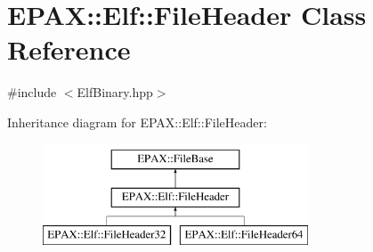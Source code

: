 \hypertarget{class_e_p_a_x_1_1_elf_1_1_file_header}{\section{\-E\-P\-A\-X\-:\-:\-Elf\-:\-:\-File\-Header \-Class \-Reference}
\label{class_e_p_a_x_1_1_elf_1_1_file_header}
}


{\ttfamily \#include $<$\-Elf\-Binary.\-hpp$>$}

\-Inheritance diagram for \-E\-P\-A\-X\-:\-:\-Elf\-:\-:\-File\-Header\-:\begin{figure}[H]
\begin{center}
\leavevmode
\includegraphics[height=3.000000cm]{class_e_p_a_x_1_1_elf_1_1_file_header}
\end{center}
\end{figure}

